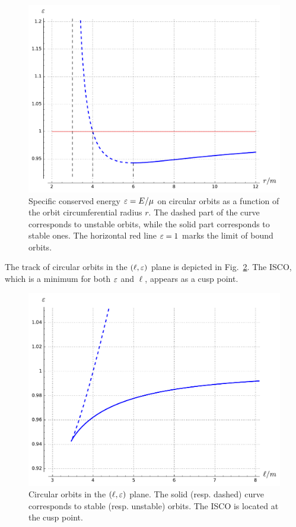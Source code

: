 \begin{figure}
\centerline{\includegraphics[height=0.4\textheight]{ges_ener_circ_orbit.pdf}}
\caption[]{\label{f:ges:ener_circ_orbit} \footnotesize
Specific conserved energy $\varepsilon = E/\mu$
on circular orbits as a function of the
orbit circumferential radius $r$.
The dashed part of the curve
corresponds to unstable orbits,
while the solid part corresponds to stable ones.
The horizontal red line $\varepsilon=1$ marks the limit of bound orbits.}
\end{figure}

The track of circular orbits in the $(\ell,\varepsilon)$ plane is depicted in
Fig.~\ref{f:ges:circ_eps_ell}. The ISCO, which is a minimum for both $\varepsilon$
and $\ell$, appears as a cusp point.

\begin{figure}
\centerline{\includegraphics[height=0.4\textheight]{ges_circ_eps_ell.pdf}}
\caption[]{\label{f:ges:circ_eps_ell} \footnotesize
Circular orbits in the $(\ell,\varepsilon)$ plane.
The solid (resp. dashed) curve
corresponds to stable (resp. unstable) orbits. The ISCO is located at the cusp point.}
\end{figure}

